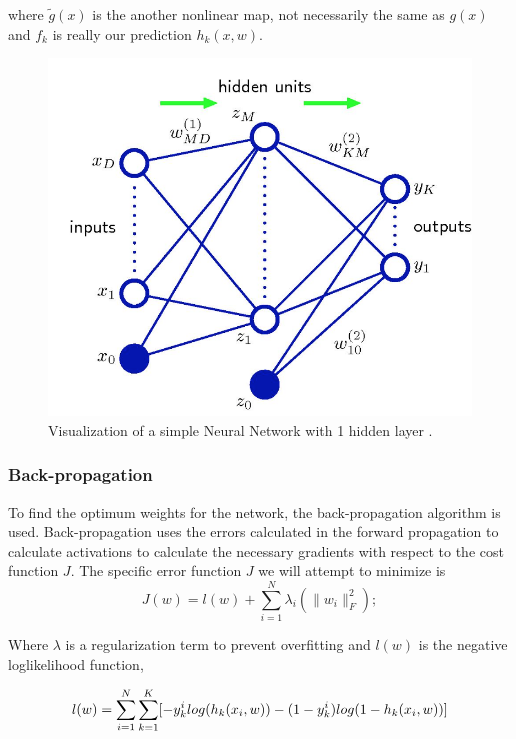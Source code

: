 \documentclass[12pt, twocolumn]{article}
\begin{document}
where $\tilde{g}(x)$ is the  another nonlinear map, not necessarily the same as $g(x)$ and $f_k$ is really our prediction $h_k(x,w)$. 

\begin{figure}
\includegraphics[scale=.6]{simpleNN.png}

\caption{Visualization of a simple Neural Network with 1 hidden layer \cite{Bishop} . }
\label{fig:basicNN}
\end{figure}






\subsubsection{Back-propagation}

To find the optimum weights for the network, the back-propagation algorithm is used. Back-propagation uses the errors calculated in the forward propagation to calculate activations to calculate the necessary gradients with respect to the cost function $J$. The specific error function $J$ we will attempt to minimize is 
\begin{equation}
J(w)= l(w) + \sum_{i=1}^N\lambda_{i}(\|w_i\|_F^2);
\end{equation}

Where  $\lambda$ is a regularization term to prevent overfitting and $l(w)$ is the negative loglikelihood function,

\begin{equation}
\scriptsize
l(w)=\sum_{i=1}^N \sum_{k=1}^K [-y^i_k log(h_k(x_i,w))-(1-y^i_k)log(1-h_k(x_i,w))]
\end{equation}
\end{document}
